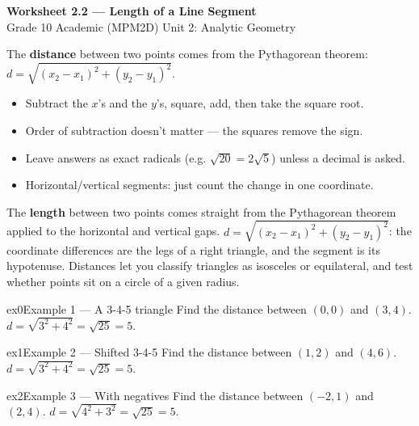 \documentclass[11pt]{article}
\begin{document}
\begin{center}
{\LARGE\bfseries\color{titleblue}Worksheet 2.2 --- Length of a Line Segment}\\[2pt]
{\small Grade 10 Academic (MPM2D) \textperiodcentered{} Unit 2: Analytic Geometry}
\end{center}

\begin{ideabox}
The \textbf{distance} between two points comes from the Pythagorean theorem: $d=\sqrt{(x_2-x_1)^2+(y_2-y_1)^2}$.
\begin{itemize}[leftmargin=*,itemsep=2pt]
  \item Subtract the $x$'s and the $y$'s, square, add, then take the square root.
  \item Order of subtraction doesn't matter --- the squares remove the sign.
  \item Leave answers as exact radicals (e.g. $\sqrt{20}=2\sqrt5$) unless a decimal is asked.
  \item Horizontal/vertical segments: just count the change in one coordinate.
\end{itemize}
\end{ideabox}

\begin{learnbox}
The \textbf{length} between two points comes straight from the Pythagorean theorem applied to the horizontal and vertical gaps.
$d=\sqrt{(x_2-x_1)^2+(y_2-y_1)^2}$: the coordinate differences are the legs of a right triangle, and the segment is its hypotenuse.
Distances let you classify triangles as isosceles or equilateral, and test whether points sit on a circle of a given radius.
\end{learnbox}


\begin{example}{ex0}{Example 1 --- A 3-4-5 triangle}
Find the distance between $(0,0)$ and $(3,4)$.
\soln $d=\sqrt{3^2+4^2}=\sqrt{25}=5.$
\end{example}

\begin{example}{ex1}{Example 2 --- Shifted 3-4-5}
Find the distance between $(1,2)$ and $(4,6)$.
\soln $d=\sqrt{3^2+4^2}=\sqrt{25}=5.$
\end{example}

\begin{example}{ex2}{Example 3 --- With negatives}
Find the distance between $(-2,1)$ and $(2,4)$.
\soln $d=\sqrt{4^2+3^2}=\sqrt{25}=5.$
\end{example}
\end{document}
